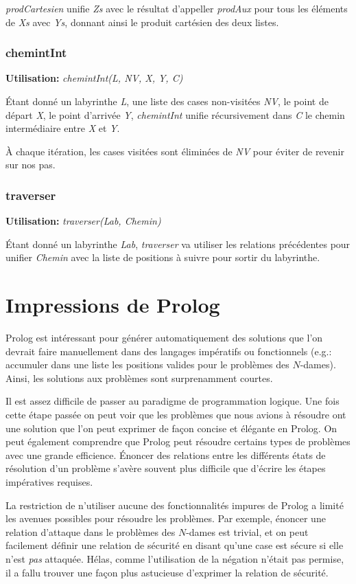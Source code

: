 \documentclass[10pt]{article}
\newcommand{\usage}[1]{\textbf{Utilisation: }\emph{#1}}
\begin{document}
\emph{prodCartesien} unifie \emph{Zs} avec le résultat d'appeller
\emph{prodAux} pour tous les éléments de \emph{Xs} avec \emph{Ys},
donnant ainsi le produit cartésien des deux listes.


\subsubsection{chemintInt}

\usage{chemintInt(L, NV, X, Y, C)}

Étant donné un labyrinthe \emph{L}, une liste des cases non-visitées
\emph{NV}, le point de départ \emph{X}, le point d'arrivée \emph{Y},
\emph{chemintInt} unifie récursivement dans \emph{C} le chemin
intermédiaire entre \emph{X} et \emph{Y}.

À chaque itération, les cases visitées sont éliminées de \emph{NV}
pour éviter de revenir sur nos pas.


\subsubsection{traverser}

\usage{traverser(Lab, Chemin)}

Étant donné un labyrinthe \emph{Lab}, \emph{traverser} va utiliser les
relations précédentes pour unifier \emph{Chemin} avec la liste de
positions à suivre pour sortir du labyrinthe.


\section{Impressions de Prolog}

Prolog est intéressant pour générer automatiquement des solutions que
l'on devrait faire manuellement dans des langages impératifs ou
fonctionnels (e.g.: accumuler dans une liste les positions valides
pour le problèmes des $N$-dames).  Ainsi, les solutions aux problèmes
sont surprenamment courtes.

Il est assez difficile de passer au paradigme de programmation
logique. Une fois cette étape passée on peut voir que les problèmes
que nous avions à résoudre ont une solution que l'on peut exprimer de
façon concise et élégante en Prolog. On peut également comprendre que
Prolog peut résoudre certains types de problèmes avec une grande
efficience. Énoncer des relations entre les différents états de
résolution d'un problème s'avère souvent plus difficile que d'écrire
les étapes impératives requises.

La restriction de n'utiliser aucune des fonctionnalités impures de
Prolog a limité les avenues possibles pour résoudre les problèmes.
Par exemple, énoncer une relation d'attaque dans le problèmes des
$N$-dames est trivial, et on peut facilement définir une relation de
sécurité en disant qu'une case est sécure si elle n'est \emph{pas}
attaquée.  Hélas, comme l'utilisation de la négation n'était pas
permise, il a fallu trouver une façon plus astucieuse d'exprimer la
relation de sécurité.
\end{document}
